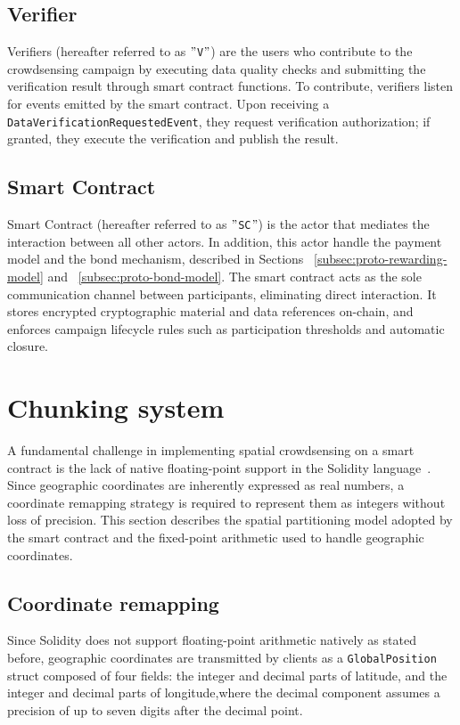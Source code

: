 \subsection{Verifier}\label{subsec:verifiers}
Verifiers (hereafter referred to as \("\)\texttt{V}\("\)) are the users who contribute to the crowdsensing campaign by executing data quality checks and submitting the verification result through smart contract functions.
To contribute, verifiers listen for events emitted by the smart contract.
Upon receiving a \texttt{DataVerificationRequestedEvent}, they request verification authorization; if granted, they execute the verification and publish the result.

\subsection{Smart Contract}\label{subsec:smartcontract}
Smart Contract (hereafter referred to as \("\)\texttt{SC}\("\)) is the actor that mediates the interaction between all other actors.
In addition, this actor handle the payment model and the bond mechanism, described in Sections ~\ref{subsec:proto-rewarding-model} and ~\ref{subsec:proto-bond-model}.
The smart contract acts as the sole communication channel between participants, eliminating direct interaction.
It stores encrypted cryptographic material and data references on-chain, and enforces campaign lifecycle rules such as participation thresholds and automatic closure.

\section{Chunking system}\label{sec:chunking-system}
A fundamental challenge in implementing spatial crowdsensing on a smart contract is the lack of native floating-point support in the Solidity language~\cite{wood2014ethereum}.
Since geographic coordinates are inherently expressed as real numbers, a coordinate remapping strategy is required to represent them as integers without loss of precision.
This section describes the spatial partitioning model adopted by the smart contract and the fixed-point arithmetic used to handle geographic coordinates.

\subsection{Coordinate remapping}\label{subsec:coordinate-remapping}
Since Solidity does not support floating-point arithmetic natively as stated before, geographic coordinates are transmitted by clients as a
\texttt{GlobalPosition} struct composed of four fields:
the integer and decimal parts of latitude, and the integer and decimal parts of longitude,where the decimal component assumes a precision of up to seven digits after the decimal point.

